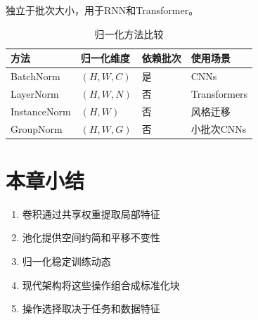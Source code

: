 独立于批次大小，用于RNN和Transformer。

\begin{table}[h]
    \centering
    \caption{归一化方法比较}
    \begin{tabular}{L{2cm} L{2.5cm} L{2.5cm} L{3cm}}
        \toprule
        \textbf{方法} & \textbf{归一化维度} & \textbf{依赖批次} & \textbf{使用场景} \\
        \midrule
        BatchNorm & $(H, W, C)$ & 是 & CNNs \\
        LayerNorm & $(H, W, N)$ & 否 & Transformers \\
        InstanceNorm & $(H, W)$ & 否 & 风格迁移 \\
        GroupNorm & $(H, W, G)$ & 否 & 小批次CNNs \\
        \bottomrule
    \end{tabular}
\end{table}

\section{本章小结}

\begin{enumerate}
    \item 卷积通过共享权重提取局部特征
    \item 池化提供空间约简和平移不变性
    \item 归一化稳定训练动态
    \item 现代架构将这些操作组合成标准化块
    \item 操作选择取决于任务和数据特征
\end{enumerate}
